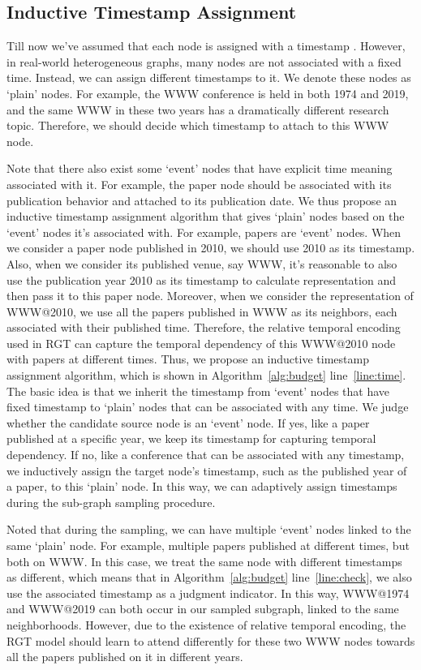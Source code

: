 \documentclass[sigconf]{acmart}
\theoremstyle{definition}
\begin{document}
{\subsection{Inductive Timestamp Assignment}
Till now we've assumed that each node  is assigned with a timestamp . However, in real-world heterogeneous graphs, many nodes are not associated with a fixed time. Instead, we can assign different timestamps to it. We denote these nodes as `plain' nodes. For example, the WWW conference is held in both 1974 and 2019, and the same WWW in these two years has a dramatically different research topic. Therefore, we should decide which timestamp to attach to this WWW node. 

Note that there also exist some `event' nodes that have explicit time meaning associated with it. For example, the paper node should be associated with its publication behavior and attached to its publication date. We thus propose an inductive timestamp assignment algorithm that gives `plain' nodes based on the `event' nodes it's associated with. For example, papers are `event' nodes. When we consider a paper node published in 2010, we should use 2010 as its timestamp. Also, when we consider its published venue, say WWW, it's reasonable to also use the publication year 2010 as its timestamp to calculate representation and then pass it to this paper node. Moreover, when we consider the representation of WWW@2010, we use all the papers published in WWW as its neighbors, each associated with their published time. Therefore, the relative temporal encoding used in RGT can capture the temporal dependency of this WWW@2010 node with papers at different times. Thus, we propose an inductive timestamp assignment algorithm, which is shown in Algorithm~\ref{alg:budget} line~\ref{line:time}. The basic idea is that we inherit the timestamp from `event' nodes that have fixed timestamp to `plain' nodes that can be associated with any time. We judge whether the candidate source node is an `event' node. If yes, like a paper published at a specific year, we keep its timestamp for capturing temporal dependency. If no, like a conference that can be associated with any timestamp, we inductively assign the target node's timestamp, such as the published year of a paper, to this `plain' node. In this way, we can adaptively assign timestamps during the sub-graph sampling procedure.


Noted that during the sampling, we can have multiple `event' nodes linked to the same `plain' node. For example, multiple papers published at different times, but both on WWW. In this case, we treat the same node with different timestamps as different, which means that in Algorithm~\ref{alg:budget} line~\ref{line:check}, we also use the associated timestamp as a judgment indicator. In this way, WWW@1974 and WWW@2019 can both occur in our sampled subgraph, linked to the same neighborhoods. However, due to the existence of relative temporal encoding, the RGT model should learn to attend differently for these two WWW nodes towards all the papers published on it in different years. 


}
\end{document}
